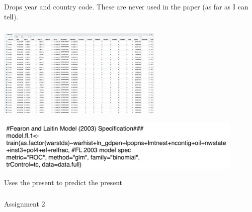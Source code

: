 \documentclass[aspectratio=169]{beamer}
\begin{document}
\begin{frame}
\frametitle{}

\begin{center}
%
%
\end{center}

\pause
\vfill
Drops year and country code. These are never used in the paper (as far as I can tell).

\end{frame}
\begin{frame}
\frametitle{}

\begin{center}
\includegraphics[width=0.6\textwidth]{figures/muchlinksi_data_used}
\end{center}

\pause

\phantom{12345}

\begin{center}
\includegraphics[width=0.9\textwidth]{figures/muchlinksi_fl}
\end{center}

\vfill
Uses the present to predict the present

\end{frame}
\begin{frame}
\frametitle{}

Assignment 2

\end{frame}
\frame{\titlepage}
\end{document}
